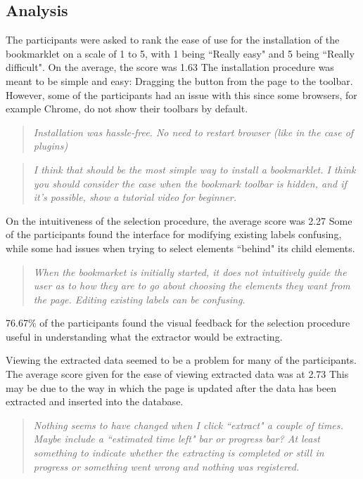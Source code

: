 \subsection{Analysis}
The participants were asked to rank the ease of use for the installation of the bookmarklet on
a scale of 1 to 5, with 1 being ``Really easy" and 5 being ``Really difficult".
 On the average, the score was 1.63 The installation procedure was meant to
be simple and easy: Dragging the button from the page to the toolbar. However, some of the 
participants had an issue with this since some browsers, for example Chrome, do not show their
toolbars by default. 
\begin{quote}
\textit{Installation was hassle-free. No need to restart browser (like in the case of plugins)}
\end{quote}
\begin{quote}
\textit{
I think that should be the most simple way to install a bookmarklet. 
I think you should consider the case when the bookmark toolbar is hidden,
and if it's possible, show a tutorial video for beginner.}
\end{quote}

On the intuitiveness of the selection procedure, the average score was 2.27
Some of the participants found the interface for modifying existing labels confusing,
while some had issues when trying to select elements ``behind" its child elements.
\begin{quote}
\textit{
When the bookmarket is initially started, it does not intuitively guide the user as
to how they are to go about choosing the elements they want from the page. Editing existing
labels can be confusing.}
\end{quote}
76.67\% of the participants found the visual feedback for the selection procedure useful
in understanding what the extractor would be extracting. 

Viewing the extracted data seemed to be a problem for many of the participants. The average
score given for the ease of viewing extracted data was at 2.73 This may be due to the way
in which the page is updated after the data has been extracted and inserted into the database.

\begin{quote}
\textit{
Nothing seems to have changed when I click ``extract" a couple of times. 
Maybe include a ``estimated time left" bar or progress bar?
At least something to indicate whether the extracting is completed or
still in progress or something went wrong and nothing was registered.}
\end{quote}


